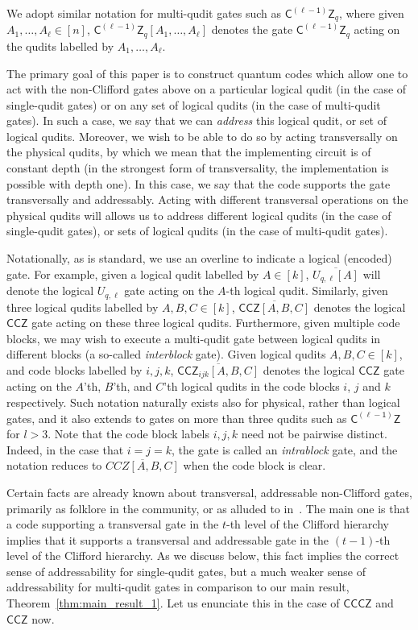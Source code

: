 \documentclass[11pt]{article}
\theoremstyle{definition}
\newcommand{\CCZ}{\mathsf{CCZ}}
\newcommand{\CCCZ}{\mathsf{CCCZ}}
\newcommand{\CLZ}{\mathsf{C^{(\ell-1)}Z}}
\begin{document}
We adopt similar notation for multi-qudit gates such as $\CLZ_q$, where given $A_1, \ldots, A_\ell \in [n]$, $\CLZ_q[A_1, \ldots, A_\ell]$ denotes the gate $\CLZ_q$ acting on the qudits labelled by $A_1, \ldots, A_\ell$.

The primary goal of this paper is to construct quantum codes which allow one to act with the non-Clifford gates above on a particular logical qudit (in the case of single-qudit gates) or on any set of logical qudits (in the case of multi-qudit gates). In such a case, we say that we can \textit{address} this logical qudit, or set of logical qudits. Moreover, we wish to be able to do so by acting transversally on the physical qudits, by which we mean that the implementing circuit is of constant depth (in the strongest form of transversality, the implementation is possible with depth one). In this case, we say that the code supports the gate transversally and addressably. Acting with different transversal operations on the physical qudits will allows us to address different logical qudits (in the case of single-qudit gates), or sets of logical qudits (in the case of multi-qudit gates).

Notationally, as is standard, we use an overline to indicate a logical (encoded) gate. For example, given a logical qudit labelled by $A \in [k]$, $\overline{U_{q,\ell}[A]}$ will denote the logical $U_{q,\ell}$ gate acting on the $A$-th logical qudit. Similarly, given three logical qudits labelled by $A,B,C \in [k]$, $\overline{\CCZ[A,B,C]}$ denotes the logical $\CCZ$ gate acting on these three logical qudits. Furthermore, given multiple code blocks, we may wish to execute a multi-qudit gate between logical qudits in different blocks (a so-called \textit{interblock} gate). Given logical qudits $A,B,C \in [k]$, and code blocks labelled by $i,j,k$, $\overline{\CCZ_{ijk}[A,B,C]}$ denotes the logical $\CCZ$ gate acting on the $A$'th, $B$'th, and $C$'th logical qudits in the code blocks $i$, $j$ and $k$ respectively. Such notation naturally exists also for physical, rather than logical gates, and it also extends to gates on more than three qudits such as $\CLZ$ for $l > 3$. Note that the code block labels $i,j,k$ need not be pairwise distinct. Indeed, in the case that $i=j=k$, the gate is called an \textit{intrablock} gate, and the notation reduces to $\overline{CCZ[A,B,C]}$ when the code block is clear.

Certain facts are already known about transversal, addressable non-Clifford gates, primarily as folklore in the community, or as alluded to in~\cite{lin2024transversal, hsin2024classifying,breuckmann2024cups}. The main one is that a code supporting a transversal gate in the $t$-th level of the Clifford hierarchy implies that it supports a transversal and addressable gate in the $(t-1)$-th level of the Clifford hierarchy. 
As we discuss below, this fact implies the correct sense of addressability for single-qudit gates, but a much weaker sense of addressability for multi-qudit gates in comparison to our main result, Theorem~\ref{thm:main_result_1}.
Let us enunciate this in the case of $\CCCZ$ and $\CCZ$ now.
\end{document}
